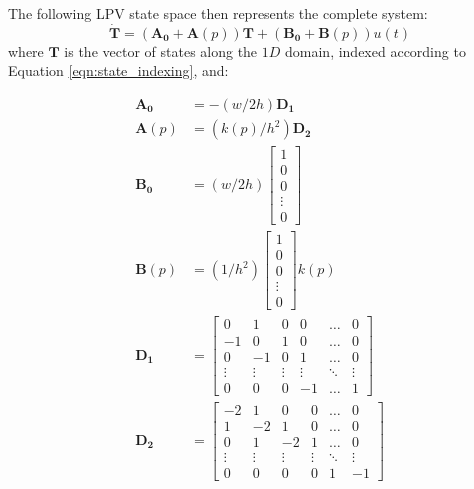 The following LPV state space then represents the complete system:
\begin{equation}
    \mathbf{\dot{T}} = \left(\mathbf{A_0} +\mathbf{A}(p)\right)\mathbf{T} + \left (\mathbf{B_0} + \mathbf{B}(p)\right)u(t)
\end{equation}
where $\mathbf{T}$ is the vector of states along the $1D$ domain, indexed according to Equation \eqref{eqn:state_indexing}, and:
\begin{footnotesize}
\begin{align}
 \mathbf{A_0} &=
 -(w/2h)\mathbf{D_1}\\
 \mathbf{A}(p) &= (k(p)/h^2)
 \mathbf{D_2}\\
 \mathbf{B_0} &=(w/2h)
 \begin{bmatrix}
     1\\
     0\\
     0\\
     \vdots\\
     0
 \end{bmatrix} \\
 \mathbf{B}(p) &=(1/h^2)
 \begin{bmatrix}
     1\\
     0\\
     0\\
     \vdots\\
     0
 \end{bmatrix}k(p)\\
 \mathbf{D_1} &=
 \begin{bmatrix}
     0 & 1 & 0 & 0 & \hdots & 0\\
     -1 & 0 & 1 & 0 & \hdots & 0\\
     0 & -1 & 0 & 1 & \hdots & 0\\
     \vdots & \vdots & \vdots & \vdots & \ddots & \vdots\\
     0 & 0 & 0 & -1 & \hdots & 1
 \end{bmatrix}\\
 \mathbf{D_2} &=
 \begin{bmatrix}
     -2 & 1 & 0 & 0 & \hdots & 0\\
     1 & - 2 & 1 & 0 & \hdots & 0\\
     0 & 1 & - 2 & 1 & \hdots & 0\\
     \vdots & \vdots & \vdots & \vdots & \ddots & \vdots \\
     0 & 0 & 0 & 0 & 1 & -1
 \end{bmatrix}
\end{align}
\end{footnotesize} 



